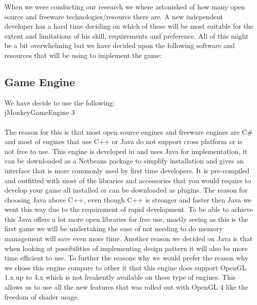 \documentclass[letterpaper]{article}
\begin{document}
		\vspace{0.2in}
		
		When we were conducting our research we where astonished of how many open source and freeware technologies/resource there are. A new independent developer has a hard time deciding on which of these will be most suitable for the extent and limitations of his skill, requirements and preference. All of this might be a bit overwhelming but we have decided upon the following software and resources that will be using to implement the game:
		
			
			\subsection*{Game Engine}
			
			\vspace{0.1cm}
			
			We have decide to use the following: \\
			\indent jMonkeyGameEngine 3 \\
			\\
			The reason for this is that most open source engines and freeware engines are C\# and most of engines that use C++ or Java do not support cross platform or is not free to use. This engine is developed in and uses Java for implementation, it can be downloaded as a Netbeans package to simplify installation and gives an interface that is more commonly used by first time developers. It is pre-compiled and outfitted with most of the libraries and accessories that you would require to develop your game all installed or can be downloaded as plugins. The reason for choosing Java above C++, even though C++ is stronger and faster then Java we went this way due to the requirement of rapid development. To be able to achieve this Java offers a lot more open libraries for free use, mostly seeing as this is the first game we will be undertaking the ease of not needing to do memory management will save even more time. Another reason we decided on Java is that when looking at possibilities of implementing design pattern it will also be more time efficient to use. To further the reasons why we would prefer the reason why we chose this engine compare to other it that this engine does support OpenGL 1.x up to 4.x which is not freakently available on these type of engines. This allows us to use all the new features that was rolled out with OpenGL 4 like the freedom of shader usage.
			
\end{document}
